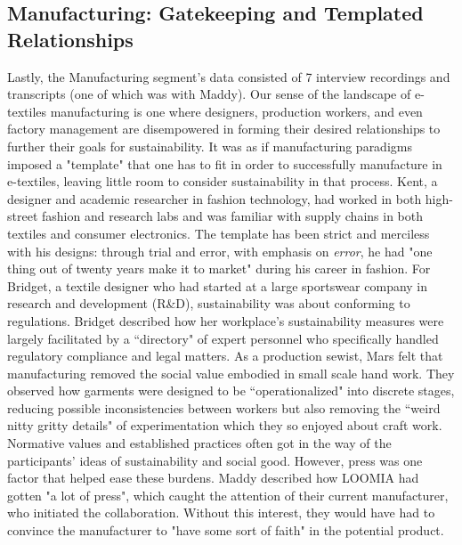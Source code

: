 \subsection{Manufacturing: Gatekeeping and Templated Relationships}
Lastly, the Manufacturing segment's data consisted of 7 interview recordings and transcripts (one of which was with Maddy). 
Our sense of the landscape of e-textiles manufacturing is one where designers, production workers, and even factory management are disempowered in forming their desired relationships to further their goals for sustainability. It was as if manufacturing paradigms imposed a "template" that one has to fit in order to successfully manufacture in e-textiles, leaving little room to consider sustainability in that process. Kent, a designer and academic researcher in fashion technology, had worked in both high-street fashion and research labs and was familiar with supply chains in both textiles and consumer electronics. The template has been strict and merciless with his designs: through trial and error, with emphasis on \textit{error}, he had "one thing out of twenty years make it to market" during his career in fashion. For Bridget, a textile designer who had started at a large sportswear company in research and development (R\&D), sustainability was about conforming to regulations. Bridget described how her workplace's sustainability measures were largely facilitated by a ``directory" of expert personnel who specifically handled regulatory compliance and legal matters. As a production sewist, Mars felt that manufacturing removed the social value embodied in small scale hand work. They observed how garments were designed to be ``operationalized" into discrete stages, reducing possible inconsistencies between workers but also removing the ``weird nitty gritty details" of experimentation which they so enjoyed about craft work. Normative values and established practices often got in the way of the participants' ideas of sustainability and social good.  However, press was one factor that helped ease these burdens. Maddy described how LOOMIA had gotten "a lot of press", which caught the attention of their current manufacturer, who initiated the collaboration. Without this interest, they would have had to convince the manufacturer to "have some sort of faith" in the potential product. 

